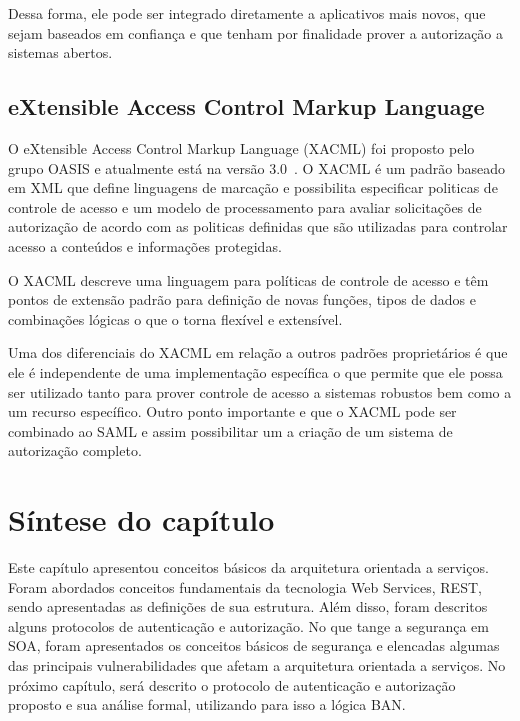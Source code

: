 Dessa forma, ele pode ser integrado diretamente a aplicativos mais novos, que sejam baseados em confiança e que tenham por finalidade  prover a autorização a sistemas abertos.

\subsection{eXtensible Access Control Markup Language}
O eXtensible Access Control Markup Language (XACML) foi proposto pelo grupo OASIS e atualmente está na versão 3.0~\cite{XACML}. O XACML é um padrão baseado em XML que define linguagens de marcação e possibilita especificar politicas de controle de acesso e um modelo de processamento para avaliar solicitações de autorização de acordo com as politicas definidas que são utilizadas para controlar acesso a conteúdos e informações protegidas.

O XACML descreve uma linguagem para políticas de controle de acesso e têm pontos de extensão padrão para definição de novas funções, tipos de dados e combinações lógicas o que o torna flexível e extensível.

Uma dos diferenciais do XACML em relação a outros padrões proprietários é que ele é independente de uma implementação específica o que permite que ele possa ser utilizado tanto para prover controle de acesso a sistemas robustos bem como a um recurso específico. Outro ponto importante e que o XACML pode ser combinado ao SAML e assim possibilitar um a criação de um sistema de autorização completo.

\section{Síntese do capítulo}

Este capítulo apresentou conceitos básicos da arquitetura orientada a serviços. Foram abordados conceitos fundamentais da tecnologia Web Services, REST, sendo apresentadas as definições de sua estrutura. Além disso, foram descritos alguns protocolos de autenticação e autorização. No que tange a segurança em SOA, foram apresentados os conceitos básicos de segurança e elencadas algumas das principais vulnerabilidades que afetam a arquitetura orientada a serviços. No próximo capítulo, será descrito o protocolo de autenticação e autorização proposto e sua análise formal, utilizando para isso a lógica BAN.

